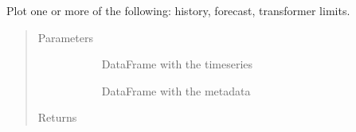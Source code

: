 \documentclass[letterpaper,10pt,english]{sphinxmanual}
\begin{document}

\begin{fulllineitems}
\label{\detokenize{autoapi/src/plot/altair/index:src.plot.altair.lightness_scale}}
\end{fulllineitems}


\begin{fulllineitems}
\label{\detokenize{autoapi/src/plot/altair/index:src.plot.altair.plot_base}}
Plot one or more of the following: history, forecast, transformer limits.
\begin{quote}\begin{description}
\item[{Parameters}] \leavevmode\begin{description}
\item[{}] \leavevmode{[}\sphinxcode{\sphinxupquote{pd.DataFrame}}{]}
DataFrame with the timeseries

\item[{}] \leavevmode{[}\sphinxcode{\sphinxupquote{pd.DataFrame}}{]}
DataFrame with the metadata

\end{description}

\item[{Returns}] \leavevmode\begin{description}
\item[{  }] \leavevmode
\end{description}

\end{description}\end{quote}

\end{fulllineitems}
\end{document}
